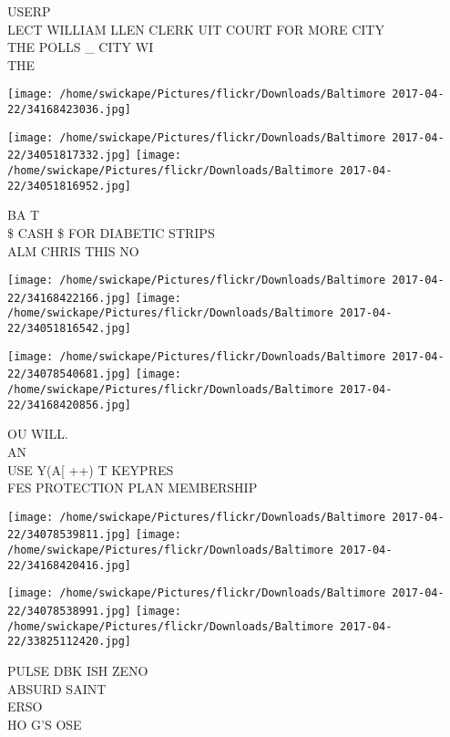\documentclass[10pt,letterpaper]{article}
\begin{document}
USERP\\
LECT WILLIAM LLEN CLERK UIT COURT FOR MORE CITY\\
THE POLLS \_ CITY WI\\
THE\\
\pagebreak

\texttt{[image: /home/swickape/Pictures/flickr/Downloads/Baltimore 2017-04-22/34168423036.jpg]}

\vspace{0.25in}
\texttt{[image: /home/swickape/Pictures/flickr/Downloads/Baltimore 2017-04-22/34051817332.jpg]}
\texttt{[image: /home/swickape/Pictures/flickr/Downloads/Baltimore 2017-04-22/34051816952.jpg]}

BA T\\
\$ CASH \$ FOR DIABETIC STRIPS\\
ALM CHRIS THIS NO\\
\pagebreak

\texttt{[image: /home/swickape/Pictures/flickr/Downloads/Baltimore 2017-04-22/34168422166.jpg]}
\texttt{[image: /home/swickape/Pictures/flickr/Downloads/Baltimore 2017-04-22/34051816542.jpg]}

\texttt{[image: /home/swickape/Pictures/flickr/Downloads/Baltimore 2017-04-22/34078540681.jpg]}
\texttt{[image: /home/swickape/Pictures/flickr/Downloads/Baltimore 2017-04-22/34168420856.jpg]}

OU WILL.\\
AN\\
USE Y(A{[} ++) T KEYPRES\\
FES PROTECTION PLAN MEMBERSHIP\\
\pagebreak

\texttt{[image: /home/swickape/Pictures/flickr/Downloads/Baltimore 2017-04-22/34078539811.jpg]}
\texttt{[image: /home/swickape/Pictures/flickr/Downloads/Baltimore 2017-04-22/34168420416.jpg]}

\texttt{[image: /home/swickape/Pictures/flickr/Downloads/Baltimore 2017-04-22/34078538991.jpg]}
\texttt{[image: /home/swickape/Pictures/flickr/Downloads/Baltimore 2017-04-22/33825112420.jpg]}

PULSE DBK ISH ZENO\\
ABSURD SAINT\\
ERSO\\
HO G'S OSE\\
\pagebreak
\end{document}

